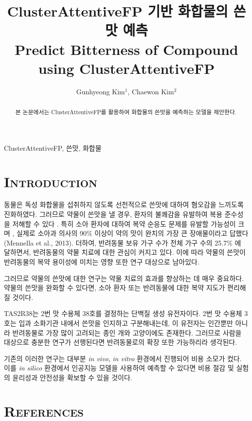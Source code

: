 \documentclass[9pt]{ieeeconf}
\title{ClusterAttentiveFP 기반 화합물의 쓴맛 예측\\
        \large Predict Bitterness of Compound using ClusterAttentiveFP}
\author{Gunhyeong Kim$^{1}$, Chaewon Kim$^{2}$}
\begin{document}
\maketitle
    \begin{abstract}
        본 논문에서는 ClusterAttentiveFP를 활용하여 화합물의 쓴맛을 예측하는 모델을 제안한다.
    \end{abstract}
    \begin{keywords}
        ClusterAttentiveFP, 쓴맛, 화합물
    \end{keywords}


\section[short]{\Large {\textsc{Introduction}}}
    
\indent 동물은 독성 화합물을 섭취하지 않도록 선천적으로 쓴맛에 대하여 혐오감을 느끼도록 진화하였다.
그러므로 약물이 쓴맛을 낼 경우, 환자의 불쾌감을 유발하여 복용 준수성을 저해할 수 있다 \cite{dagan2017bitter}.
특히 소아 환자에 대하여 복약 순응도 문제를 유발할 가능성이 크며 \cite{bahia2018bitterness},
실제로 소아과 의사의 90\% 이상이 약의 맛이 완치의 가장 큰 장애물이라고 답했다(Mennella et al., 2013).
더하여, 반려동물 보유 가구 수가 전체 가구 수의 25.7\% 에 달하면서, 반려동물의 약물 치료에 대한 관심이 커지고 있다.
이에 따라 약물의 쓴맛이 반려동물의 복약 용이성에 미치는 영향 또한 연구 대상으로 남아있다.

\indent 그러므로 약물의 쓴맛에 대한 연구는 약물 치료의 효과를 향상하는 데 매우 중요하다.
약물의 쓴맛을 완화할 수 있다면, 소아 환자 또는 반려동물에 대한 복약 지도가 편리해질 것이다.

\indent TAS2R38는 2번 맛 수용체 38호를 결정하는 단백질 생성 유전자이다.
2번 맛 수용체 3호는 입과 소화기관 내에서 쓴맛을 인지하고 구분해내는데, 이 유전자는 인간뿐만 아니라 반려동물로 가장 많이 고려되는 종인 개와 고양이에도 존재한다.
그러므로 사람을 대상으로 충분한 연구가 선행된다면 반려동물로의 확장 또한 가능하리라 생각된다.

\indent 기존의 이러한 연구는 대부분 \textit{in vivo}, \textit{in vitro} 환경에서 진행되어 비용 소모가 컸다.
이를 \textit{in silico} 환경에서 인공지능 모델을 사용하여 예측할 수 있다면 비용 절감 및 실험의 윤리성과 안전성을 확보할 수 있을 것이다.



\section[short]{\Large {\textsc{References}}}


\end{document}
